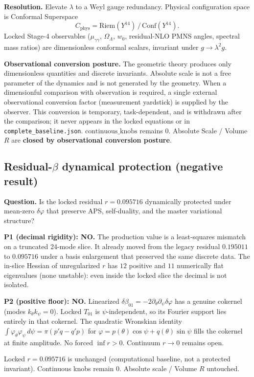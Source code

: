 \documentclass{article}
\begin{document}
\textbf{Resolution.} Elevate $\lambda$ to a Weyl gauge redundancy. Physical
configuration space is Conformal Superspace
\[
C_{\mathrm{phys}}
= \mathrm{Riem}(Y^{14})\,/\,\mathrm{Conf}(Y^{14}).
\]
Locked Stage-4 observables ($\mu_{\gamma\gamma}$, $\Omega_\Lambda$, $w_0$,
residual-NLO PMNS angles, spectral mass ratios) are dimensionless conformal
scalars, invariant under $g\to\lambda^2 g$.

\textbf{Observational conversion posture.} The geometric theory produces only
dimensionless quantities and discrete invariants. Absolute scale is not a free
parameter of the dynamics and is not generated by the geometry. When a
dimensionful comparison with observation is required, a single external
observational conversion factor (measurement yardstick) is supplied by the observer.
This conversion is temporary, task-dependent, and is withdrawn after the comparison;
it never appears in the locked equations or in \texttt{complete\_baseline.json}.
$\mathrm{continuous\_knobs}$ remains 0.
Absolute Scale / Volume $R$ are \textbf{closed by observational conversion posture}.

\subsection{Residual-$\beta$ dynamical protection (negative result)}
\textbf{Question.} Is the locked residual $r=0.095716$ dynamically
protected under mean-zero $\delta\varphi$ that preserve APS, self-duality,
and the master variational structure?

\textbf{P1 (decimal rigidity): NO.} The production value is a
least-squares mismatch on a truncated 24-mode slice. It already moved from
the legacy residual $0.195011$ to $0.095716$ under a basis enlargement that
preserved the same discrete data. The in-slice Hessian of unregularized $r$
has $12$ positive and $11$ numerically flat eigenvalues (none unstable):
even inside the locked slice the decimal is not isolated.

\textbf{P2 (positive floor): NO.} Linearized $\delta\beta_{01}=-2\partial_\theta\partial_\psi\delta\varphi$
has a genuine cokernel (modes $k_\theta k_\psi=0$). Locked $T_{01}$ is
$\psi$-independent, so its Fourier support lies entirely in that cokernel.
The quadratic Wronskian identity
$\int\varphi_\theta\varphi_\psi\,d\psi=\pi(p'q-q'p)$ for
$\varphi=p(\theta)\cos\psi+q(\theta)\sin\psi$ fills the cokernel at finite
amplitude. No forced $\inf r>0$. Continuum $r\to 0$ remains open.

Locked $r=0.095716$ is unchanged (computational baseline, not a protected
invariant). Continuous knobs remain 0. Absolute scale / Volume $R$ untouched.
\end{document}
